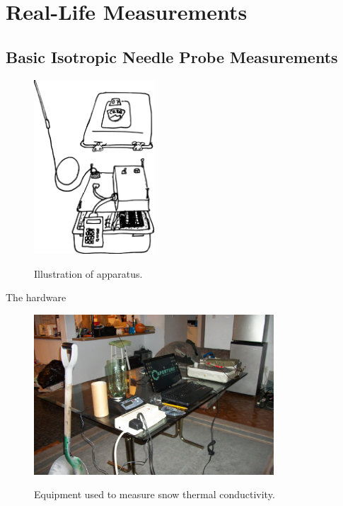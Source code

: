 \chapter{Real-Life Measurements}

\section{Basic Isotropic Needle Probe Measurements}

\begin{figure}[h]
\centering
\includegraphics[width=0.4\textwidth]{fig/apparatus.png}
\label{fig:equipment}
\caption{Illustration of apparatus.}
\end{figure}

The hardware

\begin{figure}[h]
\centering
\includegraphics[width=0.8\textwidth]{fig/equipment.jpg}
\label{fig:equipment}
\caption{Equipment used to measure snow thermal conductivity.}
\end{figure}

